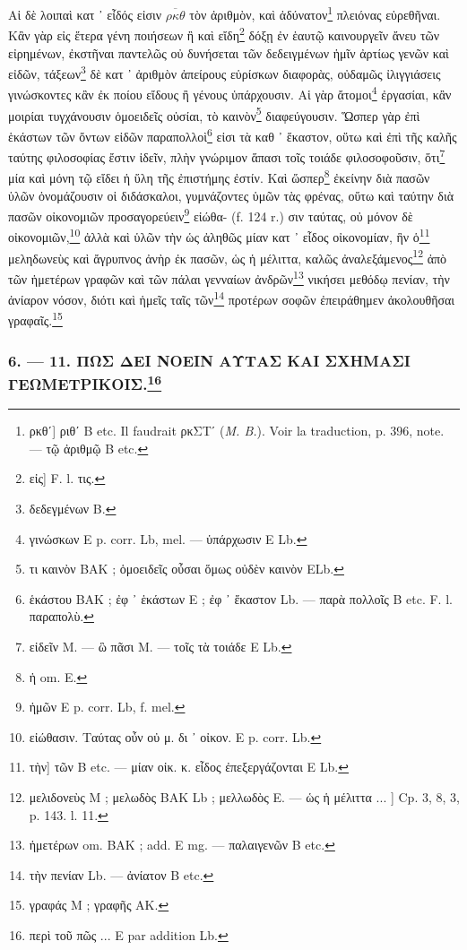 \documentclass[a4paper, 11pt, oneside, polutonikogreek, french]{article}
\begin{document}
Αἱ δὲ λοιπαὶ κατ ᾽ εἶδός εἰσιν $\overline{\rho\kappa\theta}$ τὸν ἀριθμὸν, καὶ ἀδύνατον\footnote{ρκθʹ] ριθʹ B etc. Il faudrait ρκΣΤʹ (\emph{M. B.}). Voir la traduction, p. 396, note. --- τῷ ἀριθμῷ B etc.} πλειόνας εὑρεθῆναι. Κἂν γὰρ εἰς ἕτερα γένη ποιήσεων ἢ καὶ εἴδη\footnote{εἰς] F. l. τις.} δόξῃ ἐν ἑαυτῷ καινουργεῖν ἄνευ τῶν εἰρημένων, ἐκστῆναι παντελῶς οὐ δυνήσεται τῶν δεδειγμένων ἡμῖν ἀρτίως γενῶν καὶ εἰδῶν, τάξεων\footnote{δεδεγμένων B.} δὲ κατ ᾽ ἀριθμὸν ἀπείρους εὑρίσκων διαφορὰς, οὐδαμῶς ἰλιγγιάσεις γινώσκοντες κἂν ἐκ ποίου εἴδους ἢ γένους ὑπάρχουσιν. Αἱ γὰρ ἄτομοι\footnote{γινώσκων E p. corr. Lb, mel. --- ὑπάρχωσιν E Lb.} ἐργασίαι, κἂν μοιρίαι τυγχάνουσιν ὁμοειδεῖς οὐσίαι, τὸ καινὸν\footnote{τι καινὸν BAK ; ὁμοειδεῖς οὖσαι ὅμως οὐδὲν καινὸν ELb.} διαφεύγουσιν. Ὥσπερ γὰρ ἐπὶ ἑκάστων τῶν ὄντων εἰδῶν παραπολλοὶ\footnote{ἑκάστου BAK ; ἐφ ᾽ ἑκάστων E ; ἐφ ᾽ ἕκαστον Lb. --- παρὰ πολλοῖς B etc. F. l. παραπολὺ.} εἰσι τὰ καθ ᾽ ἕκαστον, οὕτω καὶ ἐπὶ τῆς καλῆς ταύτης φιλοσοφίας ἔστιν ἰδεῖν, πλὴν γνώριμον ἅπασι τοῖς τοιάδε φιλοσοφοῦσιν, ὅτι\footnote{εἰδεῖν M. --- ὣ πᾶσι M. --- τοῖς τὰ τοιάδε E Lb.} μία καὶ μόνη τῷ εἴδει ἡ ὕλη τῆς ἐπιστήμης ἐστίν. Καὶ ὥσπερ\footnote{ἡ om. E.} ἐκείνην διὰ πασῶν ὑλῶν ὁνομάζουσιν οἱ διδάσκαλοι, γυμνάζοντες ὑμῶν τὰς φρένας, οὕτω καὶ ταύτην διὰ πασῶν οἰκονομιῶν προσαγορεύειν\footnote{ἡμῶν E p. corr. Lb, f. mel.} εἰώθα- (f. 124 r.) σιν ταύτας, οὐ μόνον δὲ οἰκονομιῶν,\footnote{εἰώθασιν. Ταύτας οὖν οὐ μ. δι ᾽ οἰκον. E p. corr. Lb.} ἀλλὰ καὶ ὑλῶν τὴν ὡς ἀληθῶς μίαν κατ ᾽ εἶδος οἰκονομίαν, ἣν ὁ\footnote{τὴν] τῶν B etc. --- μίαν οἰκ. κ. εἶδος ἐπεξεργάζονται E Lb.} μεληδωνεὺς καὶ ἄγρυπνος ἀνὴρ ἐκ πασῶν, ὡς ἡ μέλιττα, καλῶς ἀναλεξάμενος\footnote{μελιδονεὺς M ; μελωδὸς BAK Lb ; μελλωδὸς E. --- ὡς ἡ μέλιττα ... ] Cp. 3, 8, 3, p. 143. l. 11.} ἀπὸ τῶν ἡμετέρων γραφῶν καὶ τῶν πάλαι γενναίων ἀνδρῶν\footnote{ἡμετέρων om. BAK ; add. E mg. --- παλαιγενῶν B etc.} νικήσει μεθόδῳ πενίαν, τὴν ἀνίαρον νόσον, διότι καὶ ἡμεῖς ταῖς τῶν\footnote{τὴν πενίαν Lb. --- ἀνίατον B etc.} προτέρων σοφῶν ἐπειράθημεν ἀκολουθῆσαι γραφαῖς.\footnote{γραφάς M ; γραφῆς AK.}

\bigskip
\centerline{\EightStarTaper}
\centerline{\EightStarTaper\EightStarTaper}
\bigskip

\subsubsection[6. --- 11. ΠΩΣ ΔΕΙ ΝΟΕΙΝ ΑΥΤΑΣ ΚΑΙ ΣΧΗΜΑΣΙ ΓΕΩΜΕΤΡΙΚΟΙΣ.]{6. --- 11. ΠΩΣ ΔΕΙ ΝΟΕΙΝ ΑΥΤΑΣ ΚΑΙ ΣΧΗΜΑΣΙ ΓΕΩΜΕΤΡΙΚΟΙΣ.\footnote{περὶ τοῦ πῶς ... E par addition Lb.}}
\end{document}
